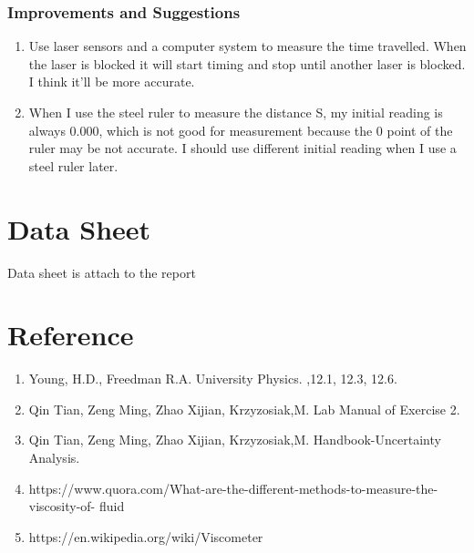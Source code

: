 \documentclass[12pt]{article}
\begin{document}
\subsubsection{Improvements and Suggestions}
\begin{enumerate}
\item Use laser sensors and a computer system to measure the time travelled. When the laser is blocked it will start timing and stop until another laser is blocked. I think it'll be more accurate.
\item When I use the steel ruler to measure the distance S, my initial reading is always 0.000, which is not good for measurement because the 0 point of the ruler may be not accurate. I should use different initial reading when I use a steel ruler later. 
\end{enumerate}
\section{Data Sheet}
Data sheet is attach to the report
\section{Reference}
\begin{enumerate}
\item Young, H.D., Freedman R.A. University Physics. ,12.1, 12.3, 12.6.
\item Qin Tian, Zeng Ming, Zhao Xijian, Krzyzosiak,M. Lab Manual of Exercise 2.
\item Qin Tian, Zeng Ming, Zhao Xijian, Krzyzosiak,M. Handbook-Uncertainty Analysis.
\item https://www.quora.com/What-are-the-different-methods-to-measure-the-viscosity-of-
fluid
\item https://en.wikipedia.org/wiki/Viscometer
\end{enumerate}
\end{document}
